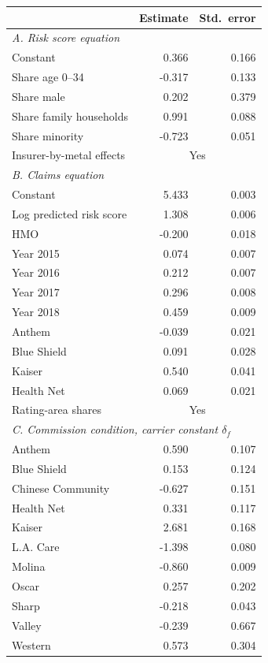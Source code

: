 \begin{tabular}{lrr}
\hline\hline
 & Estimate & Std.\ error \\
\hline
\multicolumn{3}{l}{\emph{A. Risk score equation}} \\
\quad Constant & 0.366 & 0.166 \\
\quad Share age 0--34 & -0.317 & 0.133 \\
\quad Share male & 0.202 & 0.379 \\
\quad Share family households & 0.991 & 0.088 \\
\quad Share minority & -0.723 & 0.051 \\
\quad Insurer-by-metal effects & \multicolumn{2}{c}{Yes} \\
\multicolumn{3}{l}{\emph{B. Claims equation}} \\
\quad Constant & 5.433 & 0.003 \\
\quad Log predicted risk score & 1.308 & 0.006 \\
\quad HMO & -0.200 & 0.018 \\
\quad Year 2015 & 0.074 & 0.007 \\
\quad Year 2016 & 0.212 & 0.007 \\
\quad Year 2017 & 0.296 & 0.008 \\
\quad Year 2018 & 0.459 & 0.009 \\
\quad Anthem & -0.039 & 0.021 \\
\quad Blue Shield & 0.091 & 0.028 \\
\quad Kaiser & 0.540 & 0.041 \\
\quad Health Net & 0.069 & 0.021 \\
\quad Rating-area shares & \multicolumn{2}{c}{Yes} \\
\multicolumn{3}{l}{\emph{C. Commission condition, carrier constant $\delta_f$}} \\
\quad Anthem & 0.590 & 0.107 \\
\quad Blue Shield & 0.153 & 0.124 \\
\quad Chinese Community & -0.627 & 0.151 \\
\quad Health Net & 0.331 & 0.117 \\
\quad Kaiser & 2.681 & 0.168 \\
\quad L.A. Care & -1.398 & 0.080 \\
\quad Molina & -0.860 & 0.009 \\
\quad Oscar & 0.257 & 0.202 \\
\quad Sharp & -0.218 & 0.043 \\
\quad Valley & -0.239 & 0.667 \\
\quad Western & 0.573 & 0.304 \\
\hline\hline
\end{tabular}
